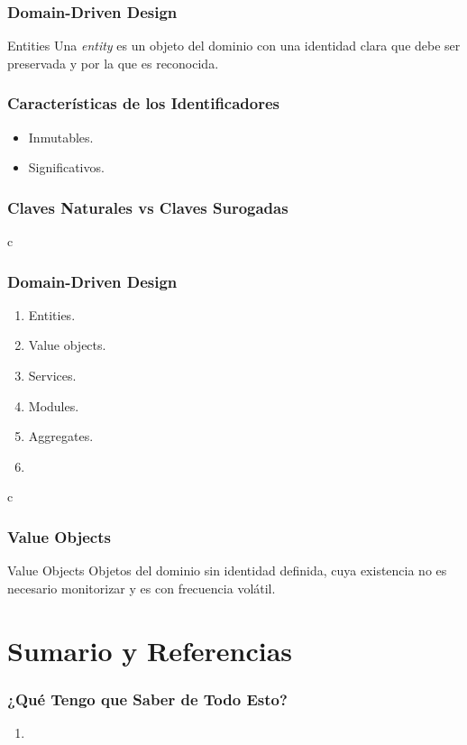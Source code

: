 \documentclass[a4paper,slidestop,xcolor=pst,dvips,blue]{beamer}
\begin{document}
\begin{frame}[c]
    \frametitle{Domain-Driven Design}
     \begin{block}{Entities}
     Una \emph{entity} es un objeto del dominio con una identidad clara que debe ser preservada y por la que es reconocida.
     \end{block}
\end{frame}

\begin{frame}[c]
    \frametitle{Características de los Identificadores}
    \begin{itemize}
        \item Inmutables.
        \item Significativos.
    \end{itemize}
\end{frame}

\begin{frame}[c]
    \frametitle{Claves Naturales vs Claves Surogadas}
\end{frame}

\begin{frame}{c}
   \frametitle{Domain-Driven Design}
   \begin{enumerate}
      \item Entities.
      \item \alert{Value objects}.
      \item Services.
      \item Modules.
      \item Aggregates.
      \item
   \end{enumerate}
\end{frame}

\begin{frame}{c}
    \frametitle{Value Objects}
    \begin{block}{Value Objects}
    Objetos del dominio sin identidad definida, cuya existencia no es necesario monitorizar y es con frecuencia volátil.
    \end{block}
\end{frame}

\section{Sumario y Referencias}

\begin{frame}[c]
    \frametitle{¿Qué Tengo que Saber de Todo Esto?}
    \begin{enumerate}[<+->]
        \item
    \end{enumerate}
\end{frame}

%
%	
%    
\end{document}
